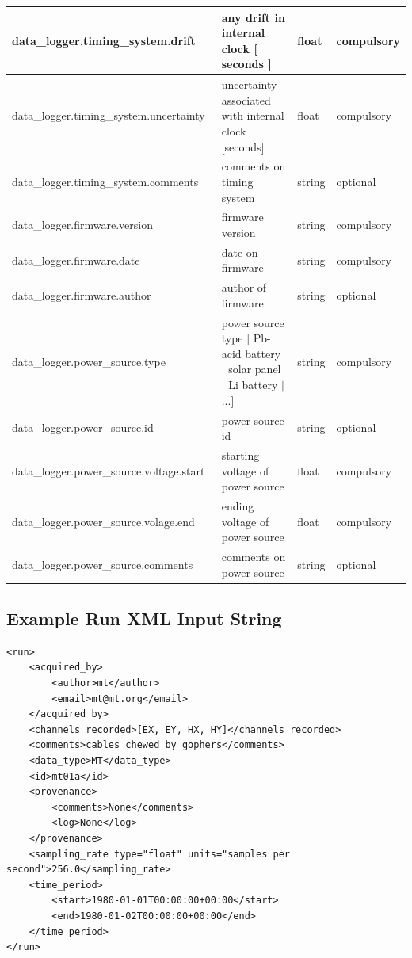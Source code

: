 \documentclass{article}
\begin{document}
\begin{table}[htb!]
\begin{tabular}{|l|p{3.4in}|l|l|}
        data\_logger.timing\_system.drift\ & any drift in internal clock [ seconds ] & float & compulsory \\ \hline
        data\_logger.timing\_system.uncertainty\ & uncertainty associated with internal clock [seconds] & float & compulsory \\ \hline
        data\_logger.timing\_system.comments\ & comments on timing system & string & optional \\ \hline
        data\_logger.firmware.version\ & firmware version & string & compulsory \\ \hline
        data\_logger.firmware.date\ & date on firmware & string & compulsory \\ \hline
        data\_logger.firmware.author\ & author of firmware & string & optional \\ \hline
        data\_logger.power\_source.type\ & power source type [ Pb-acid battery $|$ solar panel $|$ Li battery $|$ ...] & string & compulsory \\ \hline
        data\_logger.power\_source.id\ & power source id & string & optional \\ \hline
        data\_logger.power\_source.voltage.start\ & starting voltage of power source & float & compulsory \\ \hline
        data\_logger.power\_source.volage.end\ & ending voltage of power source & float & compulsory \\ \hline
        data\_logger.power\_source.comments\ & comments on power source & string & optional \\ \hline
    \end{tabular}
    \label{tab:run}
\end{table}

\subsection{Example Run XML Input String}

\begin{verbatim}
<run>
    <acquired_by>
        <author>mt</author>
        <email>mt@mt.org</email>
    </acquired_by>
    <channels_recorded>[EX, EY, HX, HY]</channels_recorded>
    <comments>cables chewed by gophers</comments>
    <data_type>MT</data_type>
    <id>mt01a</id>
    <provenance>
        <comments>None</comments>
        <log>None</log>
    </provenance>
    <sampling_rate type="float" units="samples per second">256.0</sampling_rate>
    <time_period>
        <start>1980-01-01T00:00:00+00:00</start>
        <end>1980-01-02T00:00:00+00:00</end>
    </time_period>
</run>
\end{verbatim}
\end{document}
